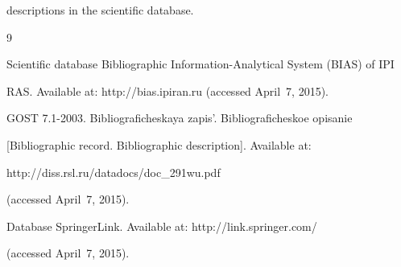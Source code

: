 {{descriptions in the scientific database.}






























\renewcommand{\bibname}{\protect\rmfamily References}







{\small\frenchspacing


{%




\begin{thebibliography}{9}




Scientific database  Bibliographic Information-Analytical System (BIAS) of  IPI


RAS. Available at: {\sf http://bias.ipiran.ru} (accessed April~7, 2015).




GOST 7.1-2003.    Bibliograficheskaya zapis'. Bibliograficheskoe opi\-sa\-nie


[Bibliographic record. Bibliographic description].  Available at: {\sf


http://diss.rsl.ru/datadocs/\linebreak doc\_291wu.pdf} (accessed April~7, 2015).




Database  SpringerLink.  Available at:  {\sf http://link.springer.com/}


(accessed April~7, 2015).



\end{thebibliography}}}}
